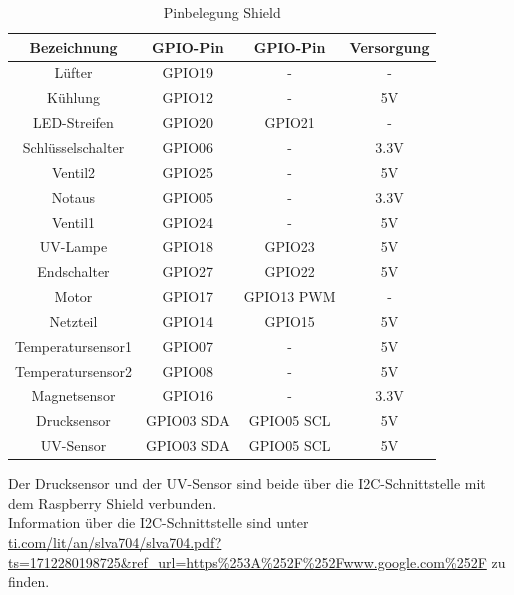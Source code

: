 \begin{table}[h]
    \centering
    \begin{tabular}{ | c | c | c | c | } 
  \hline
  \textbf{ Bezeichnung} & \textbf{ GPIO-Pin} & \textbf{ GPIO-Pin} & \textbf{ Versorgung}\\
  \hline
   Lüfter & GPIO19 & - & -  \\ 
  \hline
    Kühlung & GPIO12 & - & 5V  \\ 
  \hline
   LED-Streifen & GPIO20 & GPIO21 & - \\ 
  \hline
   Schlüsselschalter & GPIO06 & - & 3.3V \\ 
  \hline
   Ventil2 & GPIO25 & - & 5V \\
  \hline
   Notaus & GPIO05 & - & 3.3V \\
  \hline
   Ventil1 & GPIO24 & - & 5V \\
  \hline
   UV-Lampe & GPIO18 & GPIO23 & 5V \\
  \hline
   Endschalter & GPIO27 & GPIO22 & 5V \\
  \hline
   Motor & GPIO17 & GPIO13 PWM & - \\
  \hline
   Netzteil & GPIO14 & GPIO15 & 5V \\
  \hline
   Temperatursensor1 & GPIO07 & - & 5V \\
  \hline
   Temperatursensor2 & GPIO08 & - & 5V \\
  \hline
   Magnetsensor & GPIO16 & - & 3.3V \\
  \hline
   Drucksensor & GPIO03 SDA & GPIO05 SCL & 5V \\
  \hline
   UV-Sensor & GPIO03 SDA & GPIO05 SCL & 5V \\
  \hline
\end{tabular}
    \caption{Pinbelegung \raspi Shield}
\end{table}
\newpage
Der Drucksensor und der UV-Sensor sind beide über die I2C-Schnittstelle mit dem Raspberry Shield verbunden.\\
\vspace{3mm}
Information über die I2C-Schnittstelle sind unter \url{ti.com/lit/an/slva704/slva704.pdf?ts=1712280198725&ref_url=https%253A%252F%252Fwww.google.com%252F} zu finden.\\

\newpage
\begin{figure}[h]
\centering
    
\end{figure}
\pagebreak
